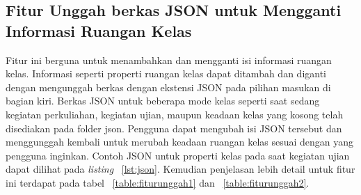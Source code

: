\subsection{Fitur Unggah berkas JSON untuk Mengganti Informasi Ruangan Kelas}
Fitur ini berguna untuk menambahkan dan mengganti isi informasi ruangan kelas. Informasi seperti properti ruangan kelas dapat ditambah dan diganti dengan mengunggah berkas dengan ekstensi JSON pada pilihan masukan di bagian kiri. Berkas JSON untuk beberapa mode kelas seperti saat sedang kegiatan perkuliahan, kegiatan ujian, maupun keadaan kelas yang kosong telah disediakan pada folder json. Pengguna dapat mengubah isi JSON tersebut dan menggunggah kembali untuk merubah keadaan ruangan kelas sesuai dengan yang pengguna inginkan. Contoh JSON untuk properti kelas pada saat kegiatan ujian dapat dilihat pada {\it listing} ~\ref{lst:json}. Kemudian penjelasan lebih detail untuk fitur ini terdapat pada tabel ~\ref{table:fiturunggah1} dan ~\ref{table:fiturunggah2}.
